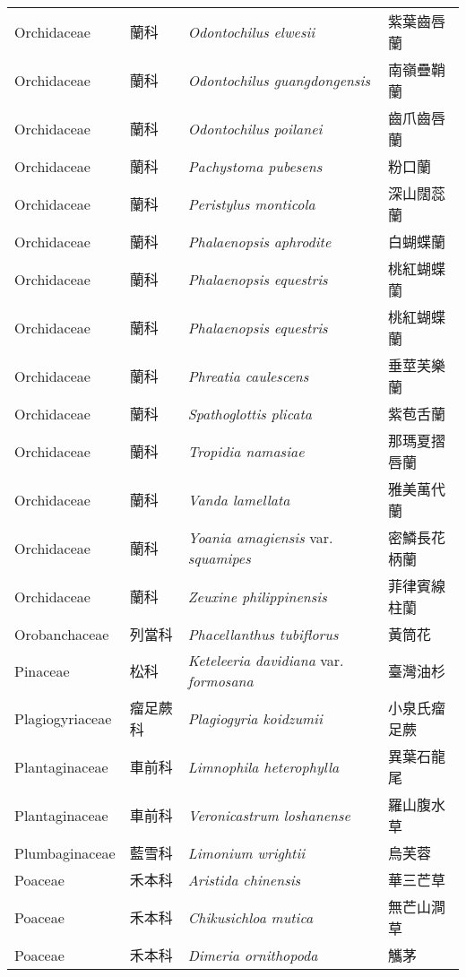 \begin{longtable}{p{3cm}p{2cm}p{5cm}p{3cm}}
    Orchidaceae & 蘭科 & \textit{Odontochilus elwesii}  & 紫葉齒唇蘭\\
    Orchidaceae & 蘭科 & \textit{Odontochilus guangdongensis}  & 南嶺疊鞘蘭\\
    Orchidaceae & 蘭科 & \textit{Odontochilus poilanei}  & 齒爪齒唇蘭\\
    Orchidaceae & 蘭科 & \textit{Pachystoma pubesens}  & 粉口蘭\\
    Orchidaceae & 蘭科 & \textit{Peristylus monticola}  & 深山闊蕊蘭\\
    Orchidaceae & 蘭科 & \textit{Phalaenopsis aphrodite}  & 白蝴蝶蘭\\
    Orchidaceae & 蘭科 & \textit{Phalaenopsis equestris}  & 桃紅蝴蝶蘭\\
    Orchidaceae & 蘭科 & \textit{Phalaenopsis equestris}  & 桃紅蝴蝶蘭\\
    Orchidaceae & 蘭科 & \textit{Phreatia caulescens}  & 垂莖芙樂蘭\\
    Orchidaceae & 蘭科 & \textit{Spathoglottis plicata}  & 紫苞舌蘭\\
    Orchidaceae & 蘭科 & \textit{Tropidia namasiae}  & 那瑪夏摺唇蘭\\
    Orchidaceae & 蘭科 & \textit{Vanda lamellata}  & 雅美萬代蘭\\
    Orchidaceae & 蘭科 & \textit{Yoania amagiensis} var. \textit{squamipes}  & 密鱗長花柄蘭\\
    Orchidaceae & 蘭科 & \textit{Zeuxine philippinensis}  & 菲律賓線柱蘭\\
    Orobanchaceae & 列當科 & \textit{Phacellanthus tubiflorus}  & 黃筒花\\
    Pinaceae & 松科 & \textit{Keteleeria davidiana} var. \textit{formosana}  & 臺灣油杉\\
    Plagiogyriaceae & 瘤足蕨科 & \textit{Plagiogyria koidzumii}  & 小泉氏瘤足蕨\\
    Plantaginaceae & 車前科 & \textit{Limnophila heterophylla}  & 異葉石龍尾\\
    Plantaginaceae & 車前科 & \textit{Veronicastrum loshanense}  & 羅山腹水草\\
    Plumbaginaceae & 藍雪科 & \textit{Limonium wrightii}  & 烏芙蓉\\
    Poaceae & 禾本科 & \textit{Aristida chinensis}  & 華三芒草\\
    Poaceae & 禾本科 & \textit{Chikusichloa mutica}  & 無芒山澗草\\
    Poaceae & 禾本科 & \textit{Dimeria ornithopoda}  & 觿茅\\

\end{longtable}
